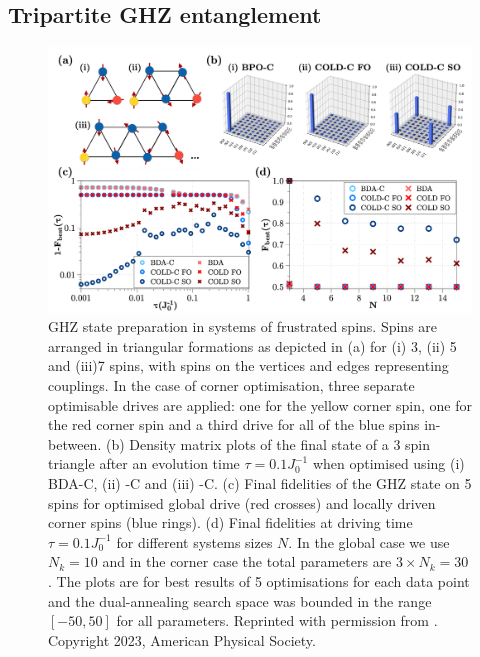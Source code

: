 \subsection{Tripartite GHZ entanglement}\label{sec:6.4.1_t3}

\begin{figure}[t!]
    \centering
    \includegraphics[width=\linewidth]{images/frustrated.png} \caption[Preparation of GHZ states in a system of frustrated spins.]{GHZ state preparation in systems of frustrated spins. Spins are arranged in triangular formations as depicted in (a) for (i) 3, (ii) 5 and (iii)7 spins, with spins on the vertices and edges representing couplings.  In the case of corner optimisation, three separate optimisable drives are applied: one for the yellow corner spin, one for the red corner spin and a third drive for all of the blue spins in-between. (b) Density matrix plots of the final state of a 3 spin triangle after an evolution time $\tau = 0.1J_0^{-1}$ when optimised using (i) BDA-C, (ii)  -C and (iii)  -C. (c) Final fidelities of the GHZ state on 5 spins for optimised global drive (red crosses) and locally driven corner spins (blue rings). (d) Final fidelities at driving time $\tau = 0.1J_0^{-1}$ for different systems sizes $N$. In the global case we use $N_k = 10$ and in the corner case the total parameters are $3 \times N_k = 30$. The plots are for best results of 5 optimisations for each data point and the dual-annealing search space was bounded in the range $[-50, 50]$ for all parameters. Reprinted with permission from \cite{cepaite_counterdiabatic_2023}. Copyright 2023, American Physical Society.} \label{fig:ghz_mainfig}
\end{figure}

